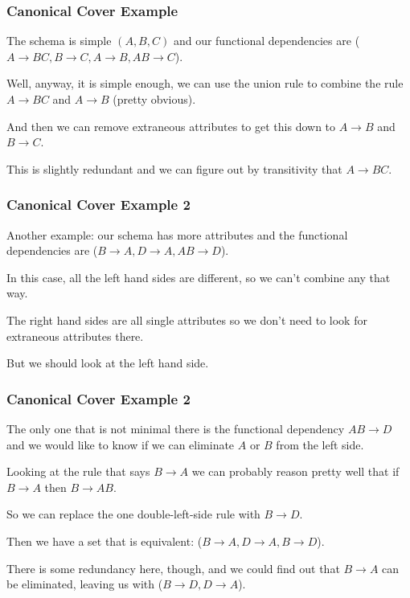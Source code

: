 \begin{frame}
\frametitle{Canonical Cover Example}

The schema is simple $(A, B, C)$ and our functional dependencies are ($A \rightarrow BC, B \rightarrow C, A \rightarrow B, AB \rightarrow C$). 

Well, anyway, it is simple enough, we can use the union rule to combine the rule $A \rightarrow BC$ and $A \rightarrow B$ (pretty obvious). 

And then we can remove extraneous attributes to get this down to $A \rightarrow B$ and $B \rightarrow C$. 

This is slightly redundant and we can figure out by transitivity that $A \rightarrow BC$. 

\end{frame}



\begin{frame}
\frametitle{Canonical Cover Example 2}

Another example:  our schema has more attributes and the functional dependencies are ($B \rightarrow A, D \rightarrow A, AB \rightarrow D$). 

In this case, all the left hand sides are different, so we can't combine any that way. 

The right hand sides are all single attributes so we don't need to look for extraneous attributes there. 

But we should look at the left hand side. 

\end{frame}



\begin{frame}
\frametitle{Canonical Cover Example 2}

The only one that is not minimal there is the functional dependency $AB \rightarrow D$ and we would like to know if we can eliminate $A$ or $B$ from the left side.

Looking at the rule that says $B \rightarrow A$ we can probably reason pretty well that if $B \rightarrow A$ then $B \rightarrow AB$.

So we can replace the one double-left-side rule with $B \rightarrow D$. 

Then we have a set that is equivalent: ($B \rightarrow A, D \rightarrow A, B \rightarrow D$). 

There is some redundancy here, though, and we could find out that $B \rightarrow A$ can be eliminated, leaving us with ($B \rightarrow D, D \rightarrow A$).

\end{frame}



